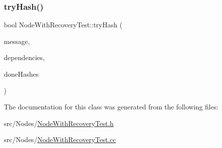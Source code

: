 \mbox{\label{class_node_with_recovery_test_a5417b50e5d5e272c8ef70ff962c0ea86}} 
\subsubsection{\texorpdfstring{try\+Hash()}{tryHash()}}
{\footnotesize\ttfamily bool Node\+With\+Recovery\+Test\+::try\+Hash (\begin{DoxyParamCaption}\item[{const \hyperlink{structures_8h_a7e7bdc1d2fff8a9436f2f352b2711ed6}{message\+Info} \&}]{message,  }\item[{const \hyperlink{class_total_dependencies}{Total\+Dependencies} \&}]{dependencies,  }\item[{unsigned}]{done\+Hashes }\end{DoxyParamCaption})\hspace{0.3cm}{\ttfamily [protected]}}



The documentation for this class was generated from the following files\+:\begin{DoxyCompactItemize}
\item 
src/\+Nodes/\hyperlink{_node_with_recovery_test_8h}{Node\+With\+Recovery\+Test.\+h}\item 
src/\+Nodes/\hyperlink{_node_with_recovery_test_8cc}{Node\+With\+Recovery\+Test.\+cc}\end{DoxyCompactItemize}
